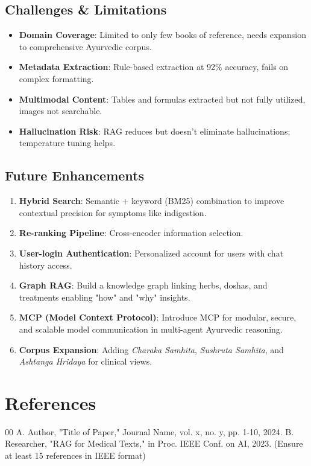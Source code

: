 \documentclass[conference]{IEEEtran}
\begin{document}
\subsection{Challenges \& Limitations}
\begin{itemize}
    \item \textbf{Domain Coverage}: Limited to only few books of reference, needs expansion to comprehensive Ayurvedic corpus.
    \item \textbf{Metadata Extraction}: Rule-based extraction at 92\% accuracy, fails on complex formatting.
    \item \textbf{Multimodal Content}: Tables and formulas extracted but not fully utilized, images not searchable.
    \item \textbf{Hallucination Risk}: RAG reduces but doesn't eliminate hallucinations; temperature tuning helps.
\end{itemize}

\subsection{Future Enhancements}
\begin{enumerate}
    \item \textbf{Hybrid Search}: Semantic + keyword (BM25) combination to improve contextual precision for symptoms like indigestion.
    \item \textbf{Re-ranking Pipeline}: Cross-encoder information selection.
    \item \textbf{User-login Authentication}: Personalized account for users with chat history access.
    \item \textbf{Graph RAG}: Build a knowledge graph linking herbs, doshas, and treatments enabling "how" and "why" insights.
    \item \textbf{MCP (Model Context Protocol)}: Introduce MCP for modular, secure, and scalable model communication in multi-agent Ayurvedic reasoning.
    \item \textbf{Corpus Expansion}: Adding \textit{Charaka Samhita}, \textit{Sushruta Samhita}, and \textit{Ashtanga Hridaya} for clinical views.
\end{enumerate}

\section*{References}

\begin{thebibliography}{00}
 A. Author, "Title of Paper," Journal Name, vol. x, no. y, pp. 1-10, 2024.
 B. Researcher, "RAG for Medical Texts," in Proc. IEEE Conf. on AI, 2023.
 (Ensure at least 15 references in IEEE format)
\end{thebibliography}
\end{document}
